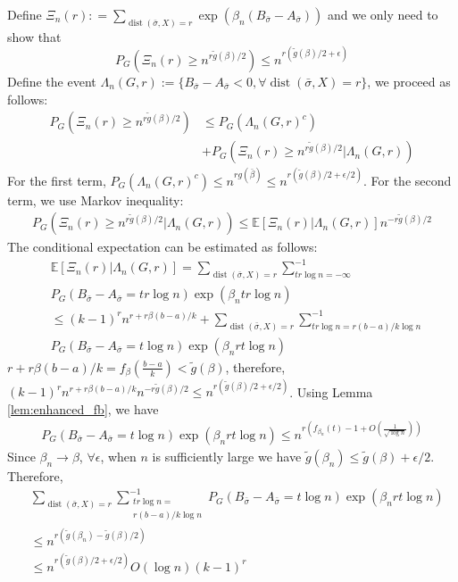 \documentclass[journal]{IEEEtran}
\newcommand{\1}{\mathbbm{1}}
\DeclareMathOperator{\dist}{dist}
\begin{document}
Define $\Xi_n(r): = \sum_{\dist(\bar{\sigma}, X)=r}\exp(\beta_n(B_{\bar{\sigma}}-A_{\bar{\sigma}}))$ and we only need to show that
\begin{equation}
P_{G}(\Xi_n(r) \geq n^{r \tilde{g}(\beta) /2}) \leq  n^{r (\tilde{g}(\beta) /2 + \epsilon)}
\end{equation}
Define the event $\Lambda_n(G,r):=\{B_{\bar{\sigma}} -A_{\bar{\sigma}} < 0, \forall \dist(\bar{\sigma}, X)=r\}$,
we proceed as follows:
\begin{align*}
P_{G}(\Xi_n(r) \geq n^{r \tilde{g}(\beta) /2}) &\leq
P_G(\Lambda_n(G,r)^c) \\
&+ P_G(\Xi_n(r) \geq n^{r \tilde{g}(\beta) /2} |\Lambda_n(G,r) )
\end{align*}
For the first term, 
$P_G(\Lambda_n(G,r)^c) \leq n^{rg(\bar{\beta})} \leq n^{r (\tilde{g}(\beta) /2 + \epsilon/2)}$.
For the second term, we use Markov inequality:
\begin{align*}
P_G(\Xi_n(r) \geq n^{r \tilde{g}(\beta) /2} |\Lambda_n(G,r) )
\leq \mathbb{E}[\Xi_n(r)|\Lambda_n(G,r)]n^{-r \tilde{g}(\beta) /2} 
\end{align*}
The conditional expectation can be estimated as follows:
\begin{align*}
&\mathbb{E}[\Xi_n(r)|\Lambda_n(G,r)]=
\sum_{\dist(\bar{\sigma}, X) = r}\sum_{tr\log n = -\infty }^{-1} \\
& P_G(B_{\bar{\sigma}} -A_{\bar{\sigma}}=tr\log n)\exp(\beta_n tr \log n) \\
& \leq (k-1)^r n^{r+r\beta(b-a)/k} +
\sum_{\dist(\bar{\sigma}, X) = r}\sum_{tr\log n = r(b-a)/k\log n }^{-1} \\
& P_G(B_{\bar{\sigma}} -A_{\bar{\sigma}}=t\log n)\exp(\beta_n rt \log n)
\end{align*}
$r+r\beta(b-a)/k = f_{\beta}(\frac{b-a}{k}) < \tilde{g}(\beta)$, therefore,
$(k-1)^r n^{r+r\beta(b-a)/k}n^{-r \tilde{g}(\beta) /2} \leq n^{r (\tilde{g}(\beta) /2 + \epsilon/2)} $.
Using Lemma \ref{lem:enhanced_fb}, we have
\begin{align*}
P_G(B_{\bar{\sigma}} -A_{\bar{\sigma}}=t\log n)\exp(\beta_n rt \log n) \leq 
n^{r(f_{\beta_n}(t)-1 + O(\frac{1}{\sqrt{\log n}}))}
\end{align*}
Since $\beta_n \to \beta$, $\forall \epsilon$, when $n$ is sufficiently large
we have $\tilde{g}(\beta_n) \leq \tilde{g}(\beta) + \epsilon /2$.
Therefore,
\begin{align*}
&\sum_{\dist(\bar{\sigma}, X) = r}\sum_{\substack{tr\log n = \\ r(b-a)/k\log n} }^{-1}
P_G(B_{\bar{\sigma}} -A_{\bar{\sigma}}=t\log n)\exp(\beta_n rt \log n) \\
& \leq  n^{r(\tilde{g}(\beta_n) - \tilde{g}(\beta)/2)}\\
& \leq  n^{r(\tilde{g}(\beta)/2 + \epsilon/2)} O(\log n) (k-1)^r
\end{align*}
\end{document}
